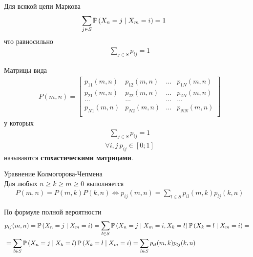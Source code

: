 \begin{Note}
    Для всякой цепи Маркова
    \begin{align*}
      & \sum_{j \in S} \mathbb{P} \left( X_n = j \mid X_{m}=i \right) =1
    \end{align*}
    что равносильно
    \begin{align*}
      & \sum_{j \in S} p_{ij} = 1
    \end{align*}   
\end{Note}
\begin{Def}
    Матрицы вида
    \begin{align*}
      & P(m,n) = \left[ \begin{matrix}
              p_{11}(m,n) & p_{12}(m,n) & \dots & p_{1N}(m,n) \\
              p_{21}(m,n) & p_{22}(m,n) & \dots & p_{2N}(m,n) \\
              \dots & \dots & \dots & \dots \\
              p_{N1}(m,n) & p_{N2}(m,n) & \dots & p_{NN}(m,n) \\
          \end{matrix} \right]
    \end{align*}
    у которых
    \begin{align*}
      & \sum_{j \in S} p_{ij} = 1
    \end{align*}   
    \begin{align*}
      & \forall i, j \ p_{ij} \in [0;1]
    \end{align*}
    называются \textbf{стохастическими матрицами}.
\end{Def}
\begin{theorem} Уравнение Колмогорова-Чепмена
    \\
    Для любых $n \geq k \geq m \geq 0$ выполняется
    \begin{align*}
      & P(m,n) = P(m,k)P(k,n) \Leftrightarrow p_{ij}(m,n) = \sum_{l \in S}p_{il}(m,k)p_{lj}(k,n)
    \end{align*}
\end{theorem}
\begin{Proof}
    По формуле полной вероятности
    \begin{align*}
      & p_{ij}(m,n) = \mathbb{P}\left( X_n = j \mid X_m = i \right) = \sum_{l \in S}\mathbb{P}\left( X_n = j \mid X_m = i, X_k = l \right)\mathbb{P}\left( X_k = l \mid X_m = i \right) = \\
      & = \sum_{l \in S}\mathbb{P}\left( X_n = j \mid X_k = l \right)\mathbb{P}\left( X_k = l \mid X_m = i \right) = \sum_{l \in S} p_{il}(m,k)p_{lj}(k,n)
    \end{align*}
\end{Proof}
